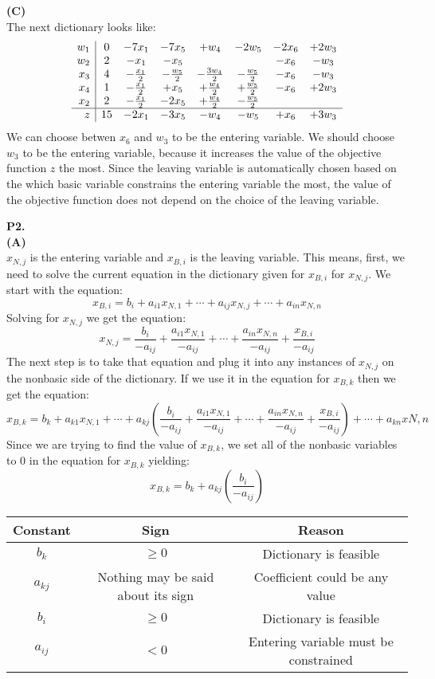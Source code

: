\documentclass[11pt]{article}
\begin{document}
\noindent\textbf{(C)}\\
The next dictionary looks like:
\[ \begin{array}{r| c c c c c c c}
w_1 & 0 &- 7x_1 &- 7x_5 &+ w_4 &- 2w_5 &- 2x_6 &+ 2w_3\\
w_2 & 2 & -x_1 & -x_5 & & & -x_6 & -w_3 \\
x_3 & 4 & -\frac{x_1}{2} & -\frac{w_5}{2} & -\frac{3w_4}{2} & -\frac{w_5}{2} & -x_6 & -w_3 \\
x_4 & 1 & -\frac{x_1}{2} & +x_5 & +\frac{w_4}{2} & +\frac{w_5}{2} & -x_6 & +2w_3 \\
x_2 & 2 & -\frac{x_1}{2} & -2x_5 & +\frac{w_4}{2} & -\frac{w_5}{2} && \\
\hline
z & 15 & -2x_1 & -3x_5 & -w_4 & -w_5 & +x_6 & +3w_3 \\
\end{array}\]
We can choose betwen $x_6$ and $w_3$ to be the entering variable.  We should choose $w_3$ to be the entering variable, because it increases the value of the objective function $z$ the most.  Since the leaving variable is automatically chosen based on the which basic variable constrains the entering variable the most, the value of the objective function does not depend on the choice of the leaving variable.

\medskip


\noindent\textbf{P2.}
\\ 
\noindent \textbf{(A)}
\\
$x_{N,j}$ is the entering variable and $x_{B,i}$ is the leaving variable.  This means, first, we need to solve the current equation in the dictionary given for $x_{B,i}$ for $x_{N,j}$.  We start with the equation:
$$
x_{B,i} = b_i + a_{i1}x_{N,1} + \cdots + a_{ij}x_{N,j} + \cdots + a_{in}x_{N,n}
$$
Solving for $x_{N,j}$ we get the equation:
$$
x_{N,j} = \frac{b_i}{-a_{ij}} + \frac{a_{i1}x_{N,1}}{-a_{ij}} + \cdots + \frac{a_{in}x_{N,n}}{-a_{ij}} + \frac{x_{B,i}}{-a_{ij}}
$$
The next step is to take that equation and plug it into any instances of $x_{N,j}$ on the nonbasic side of the dictionary.  If we use it in the equation for $x_{B,k}$ then we get the equation:
$$
x_{B,k} = b_k + a_{k1}x_{N,1} + \cdots + a_{kj}(\frac{b_i}{-a_{ij}} + \frac{a_{i1}x_{N,1}}{-a_{ij}} + \cdots + \frac{a_{in}x_{N,n}}{-a_{ij}} + \frac{x_{B,i}}{-a_{ij}}) + \cdots + a_{kn}x{N,n}
$$
Since we are trying to find the value of $x_{B,k}$, we set all of the nonbasic variables to 0 in the equation for $x_{B,k}$ yielding:
$$
x_{B,k} = b_k + a_{kj}(\frac{b_i}{-a_{ij}})
$$
\begin{tabular}{|c|c|c|}
\hline
Constant & Sign & Reason\\ \hline
$b_k$ & $\ge 0$ & Dictionary is feasible\\ \hline
$a_{kj}$ & Nothing may be said about its sign & Coefficient could be any value\\  \hline
$b_i$ & $\ge 0$ & Dictionary is feasible\\ \hline
$a_{ij}$ & $< 0$ & Entering variable must be constrained\\ \hline
\end{tabular}
\end{document}
